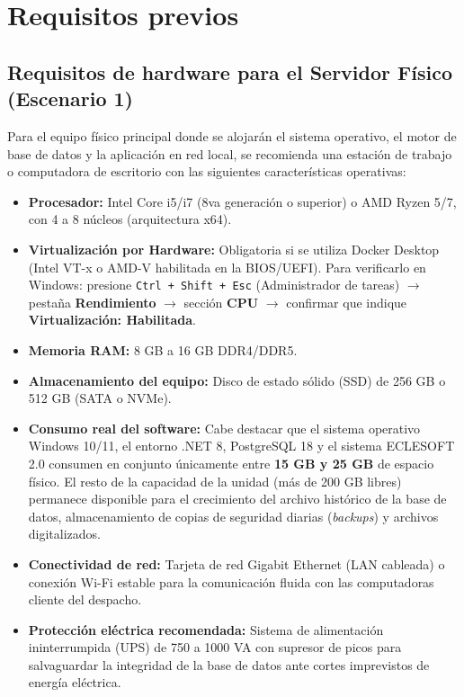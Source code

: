 \chapter{Requisitos previos}\label{cap:requisitos}

\section{Requisitos de hardware para el Servidor Físico (Escenario 1)}
Para el equipo físico principal donde se alojarán el sistema operativo, el motor de base de datos y la aplicación en red local, se recomienda una estación de trabajo o computadora de escritorio con las siguientes características operativas:
\begin{itemize}
    \item \textbf{Procesador:} Intel Core i5/i7 (8va generación o superior) o AMD Ryzen 5/7, con 4 a 8 núcleos (arquitectura x64).
    \item \textbf{Virtualización por Hardware:} Obligatoria si se utiliza Docker Desktop (Intel VT-x o AMD-V habilitada en la BIOS/UEFI). Para verificarlo en Windows: presione \texttt{Ctrl + Shift + Esc} (Administrador de tareas) $\rightarrow$ pestaña \textbf{Rendimiento} $\rightarrow$ sección \textbf{CPU} $\rightarrow$ confirmar que indique \textbf{Virtualización: Habilitada}.
    \item \textbf{Memoria RAM:} 8 GB a 16 GB DDR4/DDR5.
    \item \textbf{Almacenamiento del equipo:} Disco de estado sólido (SSD) de 256 GB o 512 GB (SATA o NVMe).
    \item \textbf{Consumo real del software:} Cabe destacar que el sistema operativo Windows 10/11, el entorno .NET 8, PostgreSQL 18 y el sistema ECLESOFT 2.0 consumen en conjunto únicamente entre \textbf{15 GB y 25 GB} de espacio físico. El resto de la capacidad de la unidad (más de 200 GB libres) permanece disponible para el crecimiento del archivo histórico de la base de datos, almacenamiento de copias de seguridad diarias (\textit{backups}) y archivos digitalizados.
    \item \textbf{Conectividad de red:} Tarjeta de red Gigabit Ethernet (LAN cableada) o conexión Wi-Fi estable para la comunicación fluida con las computadoras cliente del despacho.
    \item \textbf{Protección eléctrica recomendada:} Sistema de alimentación ininterrumpida (UPS) de 750 a 1000 VA con supresor de picos para salvaguardar la integridad de la base de datos ante cortes imprevistos de energía eléctrica.
\end{itemize}

